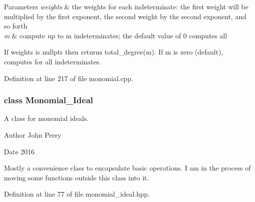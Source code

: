 \begin{DoxyParams}{Parameters}
{\em weights} & the weights for each indeterminate\+: the first weight will be multiplied by the first exponent, the second weight by the second exponent, and so forth \\
\hline
{\em m} & compute up to {\ttfamily m} indeterminates; the default value of 0 computes all\\
\hline
\end{DoxyParams}
If {\ttfamily weights} is {\ttfamily nullptr} then returns total\+\_\+degree(m). If {\ttfamily m} is zero (default), computes for all indeterminates. 

Definition at line 217 of file monomial.\+cpp.

\label{class_monomial___ideal}
\subsubsection{class Monomial\+\_\+\+Ideal}
A class for monomial ideals. 

\begin{DoxyAuthor}{Author}
John Perry 
\end{DoxyAuthor}
\begin{DoxyDate}{Date}
2016
\end{DoxyDate}
Mostly a convenience class to encapsulate basic operations. I am in the process of moving some functions outside this class into it. 

Definition at line 77 of file monomial\+\_\+ideal.\+hpp.

